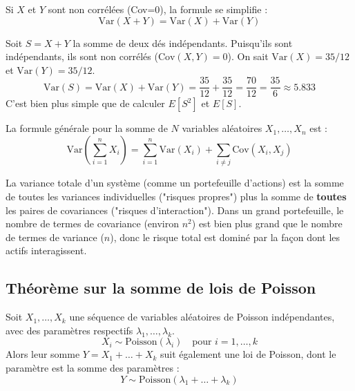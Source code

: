 \begin{theorembox}
Si $X$ et $Y$ sont non corrélées (Cov=0), la formule se simplifie :
$$ \text{Var}(X+Y) = \text{Var}(X) + \text{Var}(Y) $$
\end{theorembox}

\begin{examplebox}
Soit $S = X+Y$ la somme de deux dés indépendants.
Puisqu'ils sont indépendants, ils sont non corrélés ($\text{Cov}(X,Y)=0$).
On sait $\text{Var}(X) = 35/12$ et $\text{Var}(Y) = 35/12$.
$$ \text{Var}(S) = \text{Var}(X) + \text{Var}(Y) = \frac{35}{12} + \frac{35}{12} = \frac{70}{12} = \frac{35}{6} \approx 5.833 $$
C'est bien plus simple que de calculer $E[S^2]$ et $E[S]$.
\end{examplebox}

\begin{theorembox}
La formule générale pour la somme de $N$ variables aléatoires $X_1, \dots, X_n$ est :
$$ \text{Var}\left(\sum_{i=1}^n X_i\right) = \sum_{i=1}^n \text{Var}(X_i) + \sum_{i \neq j} \text{Cov}(X_i, X_j) $$
\end{theorembox}

\begin{intuitionbox}
La variance totale d'un système (comme un portefeuille d'actions) est la somme de toutes les variances individuelles ("risques propres") plus la somme de \textbf{toutes} les paires de covariances ("risques d'interaction"). Dans un grand portefeuille, le nombre de termes de covariance (environ $n^2$) est bien plus grand que le nombre de termes de variance ($n$), donc le risque total est dominé par la façon dont les actifs interagissent.
\end{intuitionbox}

\subsection{Théorème sur la somme de lois de Poisson}

\begin{theorembox}
Soit $X_1, \dots, X_k$ une séquence de variables aléatoires de Poisson indépendantes, avec des paramètres respectifs $\lambda_1, \dots, \lambda_k$.
$$ X_i \sim \text{Poisson}(\lambda_i) \quad \text{pour } i=1, \dots, k $$
Alors leur somme $Y = X_1 + \dots + X_k$ suit également une loi de Poisson, dont le paramètre est la somme des paramètres :
$$ Y \sim \text{Poisson}(\lambda_1 + \dots + \lambda_k) $$
\end{theorembox}

